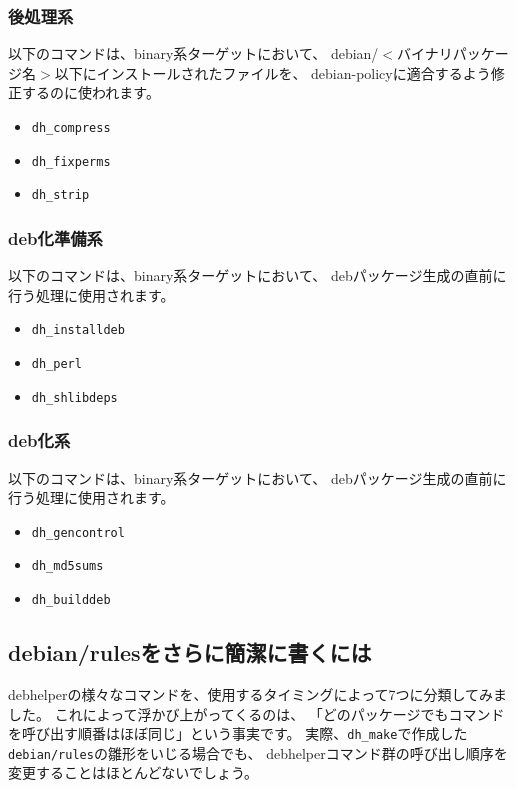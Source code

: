 \documentclass[mingoth,a4paper]{jsarticle}
\begin{document}
\subsubsection{後処理系}

以下のコマンドは、binary系ターゲットにおいて、
debian/$<$バイナリパッケージ名$>$以下にインストールされたファイルを、
debian-policyに適合するよう修正するのに使われます。

\begin{itemize}
 \item \texttt{dh\_compress}
 \item \texttt{dh\_fixperms}
 \item \texttt{dh\_strip}
\end{itemize}

\subsubsection{deb化準備系}

以下のコマンドは、binary系ターゲットにおいて、
debパッケージ生成の直前に行う処理に使用されます。

\begin{itemize}
 \item \texttt{dh\_installdeb}
 \item \texttt{dh\_perl}
 \item \texttt{dh\_shlibdeps}
\end{itemize}

\subsubsection{deb化系}

以下のコマンドは、binary系ターゲットにおいて、
debパッケージ生成の直前に行う処理に使用されます。

\begin{itemize}
 \item \texttt{dh\_gencontrol}
 \item \texttt{dh\_md5sums}
 \item \texttt{dh\_builddeb}
\end{itemize}

\subsection{debian/rulesをさらに簡潔に書くには}

debhelperの様々なコマンドを、使用するタイミングによって7つに分類してみました。
これによって浮かび上がってくるのは、
「どのパッケージでもコマンドを呼び出す順番はほぼ同じ」という事実です。
実際、\texttt{dh\_make}で作成した\texttt{debian/rules}の雛形をいじる場合でも、
debhelperコマンド群の呼び出し順序を変更することはほとんどないでしょう。
\end{document}
